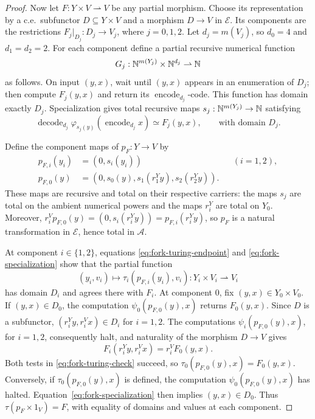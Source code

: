 \begin{proof}
Now let $F:Y\times V\rightharpoonup V$ be any partial morphism.
Choose its representation by a c.e.\ subfunctor
$D\subseteq Y\times V$ and a morphism $D\to V$ in
$\mathcal E$. Its components are the restrictions
$F_j|_{D_j}:D_j\to V_j$, where $j=0,1,2$.
Let $d_j=m(V_j)$, so $d_0=4$ and $d_1=d_2=2$.
For each component define a partial recursive numerical function
\[
 G_j:\mathbb N^{m(Y_j)}\times\mathbb N^{d_j}\rightharpoonup\mathbb N
\]
as follows. On input $(y,x)$, wait until $(y,x)$ appears in an
enumeration of $D_j$; then compute $F_j(y,x)$ and return its
$\operatorname{encode}_{d_j}$-code. This function has domain
exactly $D_j$.
Specialization gives total recursive maps
$s_j:\mathbb N^{m(Y_j)}\to\mathbb N$ satisfying
\begin{equation}\label{eq:fork-specialization}
 \operatorname{decode}_{d_j}
   \varphi_{s_j(y)}(\operatorname{encode}_{d_j}x)
 \simeq F_j(y,x),
 \qquad\text{with domain }D_j.
\end{equation}

Define the component maps of $p_F:Y\to V$ by
\begin{align*}
 p_{F,i}(y_i)&=(0,s_i(y_i)) &&(i=1,2),\\
 p_{F,0}(y)&=(0,s_0(y),s_1(r_1^Yy),s_2(r_2^Yy)).
\end{align*}
These maps are recursive and total on their respective carriers:
the maps $s_j$ are total on the ambient numerical powers and the
maps $r_i^Y$ are total on $Y_0$. Moreover,
$r_i^Vp_{F,0}(y)=(0,s_i(r_i^Yy))=p_{F,i}(r_i^Yy)$,
so $p_F$ is a natural transformation in $\mathcal E$, hence total in
$\mathcal A$.

At component $i\in\{1,2\}$, equations
\eqref{eq:fork-turing-endpoint} and
\eqref{eq:fork-specialization} show that the partial function
\[
 (y_i,v_i)\longmapsto\tau_i(p_{F,i}(y_i),v_i)
 :Y_i\times V_i\rightharpoonup V_i
\]
has domain $D_i$ and agrees there with $F_i$.
At component $0$, fix $(y,x)\in Y_0\times V_0$.
If $(y,x)\in D_0$, the computation $\psi_0(p_{F,0}(y),x)$ returns $F_0(y,x)$.
Since $D$ is a subfunctor,
$(r_i^Yy,r_i^Vx)\in D_i$ for $i=1,2$.
The computations $\psi_i(p_{F,0}(y),x)$, for $i=1,2$, consequently
halt, and naturality of the morphism $D\to V$ gives
\[
 F_i(r_i^Yy,r_i^Vx)=r_i^VF_0(y,x).
\]
Both tests in \eqref{eq:fork-turing-check} succeed, so
$\tau_0(p_{F,0}(y),x)=F_0(y,x)$.
Conversely, if $\tau_0(p_{F,0}(y),x)$ is defined, the computation
$\psi_0(p_{F,0}(y),x)$ has halted. Equation~\eqref{eq:fork-specialization}
then implies $(y,x)\in D_0$.
Thus $\tau(p_F\times1_V)=F$, with equality of domains and values
at each component.
\end{proof}

